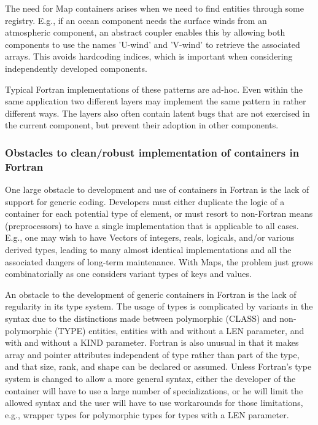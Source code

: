 \documentclass{article}
\begin{document}
The need for Map containers arises when we need to find entities
through some registry.  E.g., if an ocean component needs the surface
winds from an atmospheric component, an abstract coupler enables this
by allowing both components to use the names 'U-wind' and 'V-wind' to
retrieve the associated arrays.  This avoids hardcoding indices, which
is important when considering independently developed components.

Typical Fortran implementations of these patterns are ad-hoc.  Even
within the same application two different layers may implement the
same pattern in rather different ways.  The layers also often contain
latent bugs that are not exercised in the current component, but
prevent their adoption in other components.


\subsubsection{Obstacles to clean/robust implementation of containers in Fortran}

One large obstacle to development and use of containers in Fortran is
the lack of support for generic coding.  Developers must either
duplicate the logic of a container for each potential type of element,
or must resort to non-Fortran means (preprocessors) to have a single
implementation that is applicable to all cases.  E.g., one may wish to
have Vectors of integers, reals, logicals, and/or various derived
types, leading to many almost identical implementations and all the
associated dangers of long-term maintenance.  With Maps, the problem
just grows combinatorially as one considers variant types of keys and
values.

An obstacle to the development of generic containers in Fortran is the
lack of regularity in its type system. The usage of types is
complicated by variants in the syntax due to the distinctions made
between polymorphic (CLASS)  and non-polymorphic (TYPE) entities,
entities with and without a LEN parameter, and with and without a KIND
parameter. Fortran is also unusual in that it makes array and pointer
attributes independent of type rather than part of the type, and that
size, rank, and shape can be declared or assumed. Unless Fortran's
type system is changed to allow a more general syntax, either the
developer of the container will have to use a large number of
specializations, or he will limit the allowed syntax and the user
will have to use workarounds for those limitations, e.g., wrapper
types for polymorphic types for types with a LEN parameter.
\end{document}

